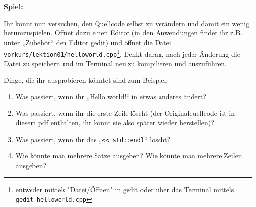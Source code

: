 \textbf{Spiel:}

Ihr könnt nun versuchen, den Quellcode selbst zu verändern und damit ein wenig
herumzuspielen. Öffnet dazu einen Editor (in den Anwendungen findet ihr z.B.
unter „Zubehör“ den Editor gedit) und öffnet die Datei
\texttt{vorkurs/lektion01/helloworld.cpp}\footnote{entweder mittels
"Datei/Öffnen" in gedit oder über das Terminal mittels \texttt{gedit
helloworld.cpp}}. Denkt daran, nach jeder Änderung die Datei zu speichern und
im Terminal neu zu kompilieren und auszuführen.

Dinge, die ihr ausprobieren könntet sind zum Beispiel:
\begin{enumerate}
    \item Was passiert, wenn ihr „Hello world!“ in etwas anderes ändert?
    \item Was passiert, wenn ihr die erste Zeile löscht (der Originalquellcode
        ist in diesem pdf enthalten, ihr könnt sie also später wieder
        herstellen)?
    \item Was passiert, wenn ihr das „\verb|<< std::endl|“ löscht?
    \item Wie könnte man mehrere Sätze ausgeben? Wie könnte man mehrere Zeilen
        ausgeben?
\end{enumerate}
